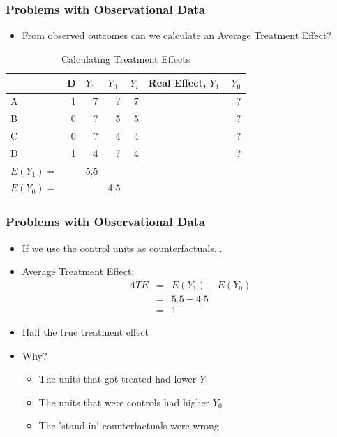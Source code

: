 \documentclass[xcolor=x11names,compress]{beamer}\usepackage[]{graphicx}\usepackage[]{color}
\renewcommand{\(}{\begin{columns}}
\renewcommand{\)}{\end{columns}}
\newcommand{\<}[1]{\begin{column}{#1}}
\renewcommand{\>}{\end{column}}
\begin{document}
\begin{frame}
\frametitle{Problems with Observational Data}
\begin{itemize}
\item From observed outcomes can we calculate an Average Treatment Effect?
\pause
\end{itemize}
\begin{table}[htbp]
  \centering
  \caption{Calculating Treatment Effects}
    \begin{tabular}{|l|r|r|r|r|r|}
    \hline
          & \multicolumn{1}{l|}{D} & \multicolumn{1}{l|}{$Y_1$} & \multicolumn{1}{l|}{$Y_0$} & \multicolumn{1}{l|}{$Y_i$} & \multicolumn{1}{l|}{Real Effect, $Y_1 - Y_0$} \bigstrut\\
    \hline
    A     & 1     & \cellcolor{teal}7     & ?     & 7     & ? \bigstrut\\
    \hline
    B     & 0     & ?     & \cellcolor{teal}5     & 5     & ? \bigstrut\\
    \hline
    C     & 0     & ?     & \cellcolor{teal}4     & 4     & ? \bigstrut\\
    \hline
    D     & 1     & \cellcolor{teal}4     & ?     & 4     & ? \bigstrut\\
    \hline \pause
    $E(Y_1)=$ & & 5.5 & & \bigstrut\\
    \hline
    $E(Y_0)=$ & &  & 4.5 & \bigstrut\\
    \hline
    \end{tabular}%
  \label{tab:addlabel}%
\end{table}%
\end{frame}

\begin{frame}
\frametitle{Problems with Observational Data}
\begin{itemize}
\item If we use the control units as counterfactuals...
\pause
\item Average Treatment Effect:
\begin{align}
ATE &=& E(Y_1) - E(Y_0) \\
&=& 5.5 - 4.5 \\
&=& 1
\end{align}
\item Half the true treatment effect
\pause
\item Why?
\pause
\begin{itemize}
\item The units that got treated had lower $Y_1$
\item The units that were controls had higher $Y_0$
\pause
\item The 'stand-in' counterfactuals were wrong
\end{itemize}
\end{itemize}
\end{frame}
\end{document}
